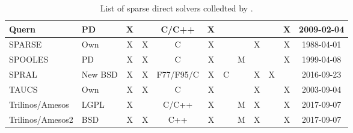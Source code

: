 \begin{table}[]
\begin{adjustbox}{angle=90}
\begin{tabular}{|l|l|c|c|c|c|c|c|c|c|c|c|}
Quern                 & PD       & X          &              & C/C++     & X       &         &       &             &          & X         & 2009-02-04        \\ \hline
SPARSE                & Own      & X          & X            & C         & X       &         &       & X           &          & X         & 1988-04-01        \\ \hline
SPOOLES               & PD       & X          & X            & C         & X       &         & M     &             &          & X         & 1999-04-08        \\ \hline
SPRAL                 & New BSD  & X          & X            & F77/F95/C & X       & C       &       & X           & X        &           & 2016-09-23        \\ \hline
TAUCS                 & Own      & X          & X            & C         & X       &         &       & X           &          & X         & 2003-09-04        \\ \hline
Trilinos/Amesos       & LGPL     & X          &              & C/C++     & X       &         & M     & X           &          & X         & 2017-09-07        \\ \hline
Trilinos/Amesos2      & BSD      & X          & X            & C++       & X       &         & M     & X           &          & X         & 2017-09-07        \\ \hline
\end{tabular}
   \end{adjustbox}
   \caption{List of sparse direct solvers colledted by \cite{list-of-solvers}.}
   \label{tab:solvers}
\end{table}

